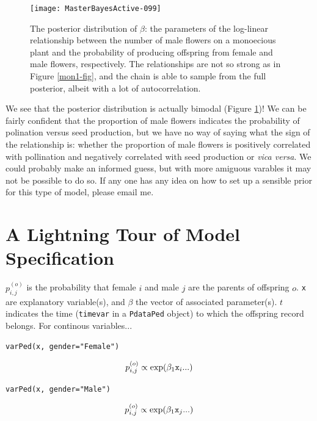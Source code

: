 \documentclass{article}
\begin{document}
\begin{figure}[!h]
\begin{center}
\texttt{[image: MasterBayesActive-099]}
\end{center}
\caption{The posterior distribution of $\beta$: the parameters of the log-linear relationship between the number of male flowers on a monoecious plant and the probability of producing offspring from female and male flowers, respectively. The relationships are not so strong as in Figure \ref{mon1-fig}, and the chain is able to sample from the full posterior, albeit with a lot of autocorrelation.}
\label{mon2-fig}
\end{figure}

We see that the posterior distribution is actually bimodal (Figure \ref{mon2-fig})! We can be fairly confident that the proportion of male flowers indicates the probability of polination versus seed production, but we have no way of saying what the sign of the relationship is: whether the proportion of male flowers is positively correlated with pollination and negatively correlated with seed production or \emph{vica versa}.  We could probably make an informed guess, but with more amiguous varables it may not be possible to do so.  If any one has any idea on how to set up a sensible prior for this type of model, please email me.  

\appendix
\section{A Lightning Tour of Model Specification}
\label{models-app}

$p^{(o)}_{i,j}$ is the probability that female $i$ and male $j$ are the parents of offspring $o$. \texttt{x} are explanatory variable(s), and $\beta$ the vector of associated parameter(s). $t$ indicates the time (\texttt{timevar} in a \texttt{PdataPed} object) to which the offspring record belongs.  For continous variables...

\texttt{varPed(x, gender="Female")}

\begin{equation}
p^{(o)}_{i,j} \propto \textrm{exp}(\beta_{1}\textrm{\texttt{x}}_{i}...)
\end{equation}

\texttt{varPed(x, gender="Male")}

\begin{equation}
p^{(o)}_{i,j} \propto \textrm{exp}(\beta_{1}\textrm{\texttt{x}}_{j}...)
\end{equation}
\end{document}
